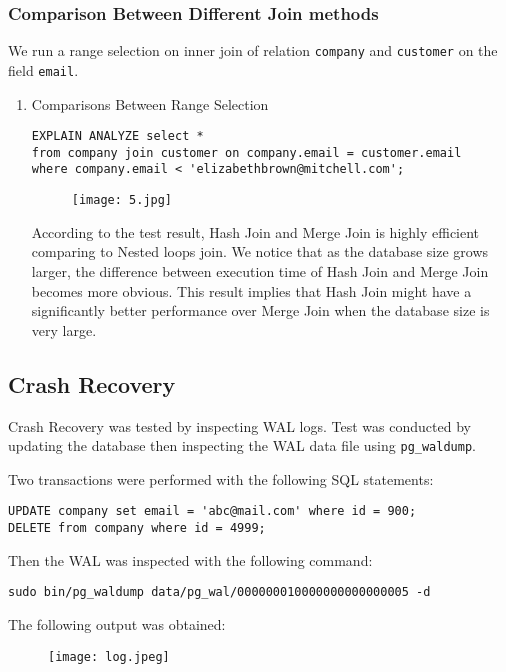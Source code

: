 \documentclass[a4paper]{article}
\begin{document}
\subsubsection{Comparison Between Different Join methods}

We run a range selection on inner join of relation \texttt{company} and \texttt{customer} on the field \texttt{email}. 
\begin{enumerate} 
    \item Comparisons Between Range Selection
        \begin{lstlisting}
EXPLAIN ANALYZE select * 
from company join customer on company.email = customer.email 
where company.email < 'elizabethbrown@mitchell.com';
    \end{lstlisting}

    \begin{figure}[H]
    \centering
    \texttt{[image: 5.jpg]}
    \caption{}
    \end{figure}
According to the test result, Hash Join and Merge Join is highly efficient comparing to Nested loops join. We notice that as the database size grows larger, the difference between execution time of Hash Join and Merge Join becomes more obvious. This result implies that Hash Join might have a significantly better performance over Merge Join when the database size is very large.     
    
\end{enumerate}
\subsection{Crash Recovery}
Crash Recovery was tested by inspecting WAL logs. Test was conducted by updating the database then inspecting the WAL data file using \texttt{pg\_waldump}. 

Two transactions were performed with the following SQL statements:
\begin{lstlisting}
UPDATE company set email = 'abc@mail.com' where id = 900;
DELETE from company where id = 4999;
\end{lstlisting}

Then the WAL was inspected with the following command:
\begin{lstlisting}
sudo bin/pg_waldump data/pg_wal/000000010000000000000005 -d
\end{lstlisting}

The following output was obtained:
    \begin{figure}[H]
    \centering
    \texttt{[image: log.jpeg]}
    \caption{}
    \end{figure}
    
\end{document}
